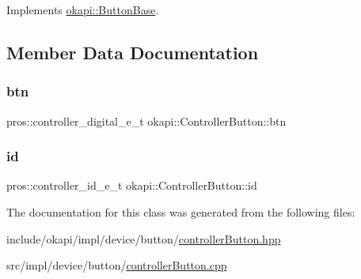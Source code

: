 Implements \mbox{\hyperlink{classokapi_1_1ButtonBase_a748b6f2b5ebce9fa9f6bbc9d170d3d7a}{okapi\+::\+Button\+Base}}.



\subsection{Member Data Documentation}
\mbox{\label{classokapi_1_1ControllerButton_aec7d466c709dac6876d8f27245afde1e}} 
\subsubsection{\texorpdfstring{btn}{btn}}
{\footnotesize\ttfamily pros\+::controller\+\_\+digital\+\_\+e\+\_\+t okapi\+::\+Controller\+Button\+::btn\hspace{0.3cm}{\ttfamily [protected]}}

\mbox{\label{classokapi_1_1ControllerButton_a0e671c560eccd470d1a00f3f5444cc53}} 
\subsubsection{\texorpdfstring{id}{id}}
{\footnotesize\ttfamily pros\+::controller\+\_\+id\+\_\+e\+\_\+t okapi\+::\+Controller\+Button\+::id\hspace{0.3cm}{\ttfamily [protected]}}



The documentation for this class was generated from the following files\+:\begin{DoxyCompactItemize}
\item 
include/okapi/impl/device/button/\mbox{\hyperlink{controllerButton_8hpp}{controller\+Button.\+hpp}}\item 
src/impl/device/button/\mbox{\hyperlink{controllerButton_8cpp}{controller\+Button.\+cpp}}\end{DoxyCompactItemize}
